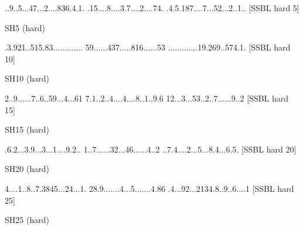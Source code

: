 \documentclass[twoside]{article}
\begin{document}

\clearpage
{}

\renewcommand*{\puzzlefile}{sh5.sud}
\writepuzzle%
{..9..5...}{47...2...}{.836.4.1.}%
{.15....8.}{...3.7...}{.2....74.}%
{.4.5.187.}{...7...52}{...2..1..}%
[SSBL hard 5]
\vfill
\begin{minipage}{0.95\linewidth}\begin{center}
SH5 (hard) \\
\end{center}\end{minipage}

\renewcommand*{\puzzlefile}{sh10.sud}
\writepuzzle%
{.3.921..5}{15.83....}{.........}%
{59......4}{37.....81}{6......53}%
{.........}{....19.26}{9..574.1.}%
[SSBL hard 10]
\vfill
\begin{minipage}{0.95\linewidth}\begin{center}
SH10 (hard) \\
\end{center}\end{minipage}

\renewcommand*{\puzzlefile}{sh15.sud}
\writepuzzle%
{2..9.....}{.7..6..59}{...4...61}%
{7.1..2..4}{....4....}{8..1..9.6}%
{12...3...}{53..2..7.}{.....9..2}%
[SSBL hard 15]
\vfill
\begin{minipage}{0.95\linewidth}\begin{center}
SH15 (hard) \\
\end{center}\end{minipage}

\renewcommand*{\puzzlefile}{sh20.sud}
\writepuzzle%
{.6.2...3.}{9...3...1}{....9.2..}%
{1..7.....}{.32...46.}{.....4..2}%
{..7.4....}{2...5...8}{.4...6.5.}%
[SSBL hard 20]
\vfill
\begin{minipage}{0.95\linewidth}\begin{center}
SH20 (hard) \\
\end{center}\end{minipage}

\renewcommand*{\puzzlefile}{sh25.sud}
\writepuzzle%
{4....1..8}{..7.3845.}{..24...1.}%
{28.9.....}{..4...5..}{.....4.86}%
{.4...92..}{.2134.8..}{9..6....1}%
[SSBL hard 25]
\vfill
\begin{minipage}{0.95\linewidth}\begin{center}
SH25 (hard) \\
\end{center}\end{minipage}
\end{document}
